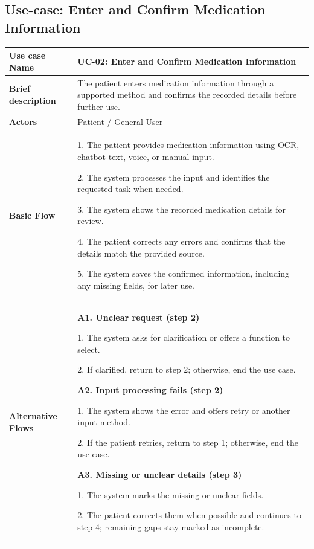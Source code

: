 
\clearpage
\subsection{Use-case: Enter and Confirm Medication Information}
\label{uc:uc-02}
\begin{longtable}{|p{}|p{}|}
\hline
\textbf{Use case Name} & UC-02: Enter and Confirm Medication Information \\ \hline
\textbf{Brief description} & The patient enters medication information through a supported method and confirms the recorded details before further use. \\ \hline
\textbf{Actors} & Patient / General User \\ \hline
\textbf{Basic Flow} &
1. The patient provides medication information using OCR, chatbot text, voice, or manual input.\par
2. The system processes the input and identifies the requested task when needed.\par
3. The system shows the recorded medication details for review.\par
4. The patient corrects any errors and confirms that the details match the provided source.\par
5. The system saves the confirmed information, including any missing fields, for later use.
\\ \hline
\textbf{Alternative Flows} &
\textbf{A1. Unclear request (step 2)}\par
1. The system asks for clarification or offers a function to select.\par
2. If clarified, return to step 2; otherwise, end the use case.
\par\smallskip
\textbf{A2. Input processing fails (step 2)}\par
1. The system shows the error and offers retry or another input method.\par
2. If the patient retries, return to step 1; otherwise, end the use case.
\par\smallskip
\textbf{A3. Missing or unclear details (step 3)}\par
1. The system marks the missing or unclear fields.\par
2. The patient corrects them when possible and continues to step 4; remaining gaps stay marked as incomplete.
\par\smallskip

\end{longtable}
